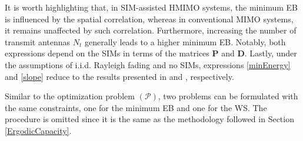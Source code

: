 \documentclass[twocolumn,10pt]{IEEEtran}
\def\bD{{\mathbf{D}}}
\def\bP{{\mathbf{P}}}
\begin{document}
	It is worth highlighting that, in SIM-assisted HMIMO systems, the minimum EB is influenced by the spatial correlation, whereas in conventional MIMO systems, it remains unaffected by such correlation. Furthermore, increasing the number of transmit antennas $ N_{t}$ generally leads to a higher minimum EB. Notably, both expressions depend on the SIMs in terms of the matrices $\bP$ and $\bD$. Lastly, under the assumptions of i.i.d. Rayleigh fading and no SIMs, expressions \eqref{minEnergy} and \eqref{slope} reduce to 
	the results presented in \cite[eq. (17)]{Lozano2003} and \cite[eq. (19)]{Lozano2003}, respectively.
	
	Similar to the optimization problem $ (\mathcal{P}) $, two problems can be formulated with the same constraints, one for the  minimum EB and one for the WS. The procedure is omitted since it is the same as the methodology followed in Section \ref{ErgodicCapacity}.
	
\end{document}
